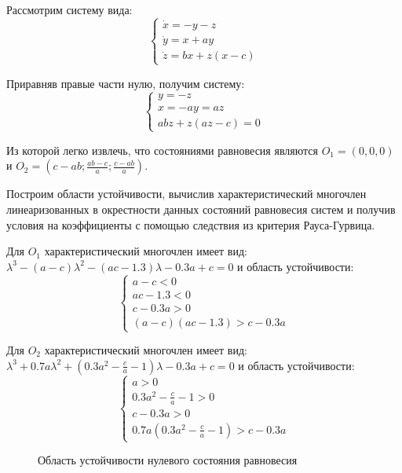 \documentclass[12pt, a4paper]{article}
\begin{document}
Рассмотрим систему вида:
\begin{equation*}
	\begin{cases}
		\dot x = - y - z \\
		\dot y = x + a  y \\
		\dot z = b  x + z  (x - c)
	\end{cases}
\end{equation*}

Приравняв правые части нулю, получим систему:
\begin{equation*}
	\begin{cases}
		y = -z \\
		x = -ay = az \\
		abz + z(az - c) = 0
	\end{cases}
\end{equation*}

Из которой легко извлечь, что состояниями равновесия являются $O_1 = (0, 0, 0)$ и $O_2 = (c - ab; \frac{ab - c}{a}; \frac{c - ab}{a})$.

Построим области устойчивости, вычислив характеристический многочлен линеаризованных в окрестности данных состояний равновесия систем и получив условия на коэффициенты с помощью следствия из критерия Рауса-Гурвица.

Для $O_1$ характеристический многочлен имеет вид:
$ \lambda^3 - (a - c)\lambda^2 - (ac - 1.3)\lambda - 0.3a + c = 0 $
и область устойчивости:
\begin{equation*}
	\begin{cases}
		a - c < 0 \\
		ac - 1.3 < 0 \\
		c - 0.3 a > 0 \\
		(a - c)(ac - 1.3) > c - 0.3 a
	\end{cases}
\end{equation*}

Для $O_2$ характеристический многочлен имеет вид:
$ \lambda^3 + 0.7 a \lambda^2 + (0.3a^2 - \frac{c}{a} - 1)\lambda - 0.3a + c = 0 $
и область устойчивости:
\begin{equation*}
	\begin{cases}
		a > 0 \\
		0.3a^2 - \frac{c}{a} - 1 > 0 \\
		c - 0.3 a > 0 \\
		0.7a(0.3a^2 - \frac{c}{a} - 1) > c - 0.3 a
	\end{cases}
\end{equation*}

\begin{figure}[H]
	\caption{Область устойчивости нулевого состояния равновесия}
\end{figure}
\end{document}
